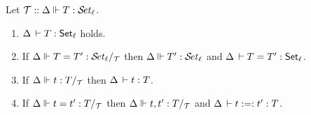 \documentclass[acmlarge,review,anonymous]{acmart}\settopmatter{printfolios=true}
\begin{document}
\begin{caselist}
\end{caselist}





\begin{lemma}
  Let $\T :: \sty \Delta T \ell$.
  \begin{enumerate}
  \item $\Delta \der T : \Set[\ell]$ holds.
  \item \label{it:styeq} If $\steqd \Delta T {T'} \ell \T$ then
    $\sty \Delta {T'} \ell$ and
    $\Delta \der T = T' : \Set[\ell]$.
  \item If $\sttmd \Delta t T \T$ then $\Delta \der t : T$.
  \item If $\stmeqd \Delta t {t'} T \T$ then $\sttmd \Delta {t,t'} T \T$ and $\Delta \der t :=: t' : T$.
  \end{enumerate}
\end{lemma}
\end{document}

